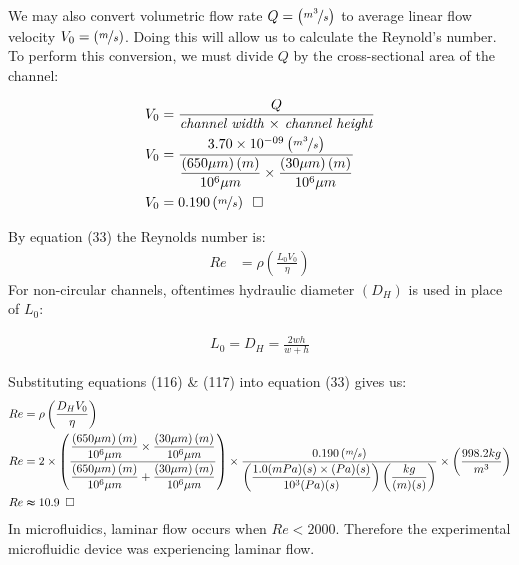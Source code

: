 \documentclass[titlepage]{article}
\begin{document}
\newpage 
\noindent We may also convert volumetric flow rate $Q=\left(\displaystyle\nicefrac{m^3}{s}\right)$ to average linear flow velocity $V_{0}=\left(\displaystyle\nicefrac{m}{s}\right)$. Doing this will allow us to calculate the Reynold's number. To perform this conversion, we must divide $Q$ by the cross-sectional area of the channel: 

\begin{align}
    V_{0} &= \displaystyle\frac{Q}{\text{\emph{channel width $\times$ channel height}}}  \\
    V_{0} &= \displaystyle\frac{3.70\times{10^{-09}}\left(\displaystyle\nicefrac{m^3}{s}\right)}{\displaystyle\frac{\left(650\mu{m}\right)\left(m\right)}{10^{6}\mu{m}}\times\displaystyle\frac{\left(30\mu{m}\right)\left(m\right)}{10^{6}\mu{m}}} \\
    V_{0} &= 0.190\left(\displaystyle\nicefrac{m}{s}\right)\hspace*{5pt}\square
\end{align}

\noindent By equation (33) the Reynolds number is: 
\begin{align*}
    Re &= \rho\left(\displaystyle\frac{L_{0}V_{0}}{\eta}\right)
\end{align*}
\noindent For non-circular channels, oftentimes hydraulic diameter $\left(D_{H}\right)$ is used in place of $L_{0}$: 

\begin{align}
    L_{0} = D_{H} = \displaystyle\frac{2{w}{h}}{w+h}
\end{align}

\noindent Substituting equations (116) \& (117) into equation (33) gives us:
\begingroup
    \addtolength\jot{5pt}
    \begin{align}
        Re &= \rho\left(\displaystyle\frac{D_{H}V_{0}}{\eta}\right) \\
        Re &= 2\times\left(\displaystyle\frac{\displaystyle\frac{\left(650\mu{m}\right)\left(m\right)}{10^{6}\mu{m}}\times\displaystyle\frac{\left(30\mu{m}\right)\left(m\right)}{10^{6}\mu{m}}}{\displaystyle\frac{\left(650\mu{m}\right)\left(m\right)}{10^{6}\mu{m}}+\displaystyle\frac{\left(30\mu{m}\right)\left(m\right)}{10^{6}\mu{m}}}\right)\times\displaystyle\frac{0.190\left(\displaystyle\nicefrac{m}{s}\right)}{\left(\displaystyle\frac{1.0(mPa)(s)\times(Pa)(s)}{10^{3}(Pa)(s)}\right)\left(\displaystyle\frac{kg}{(m)(s)}\right)}\times\left(\displaystyle\frac{998.2kg}{m^3}\right) \\
        Re &\thickapprox 10.9 \hspace*{5pt}\square
    \end{align}
\endgroup
\noindent In microfluidics, laminar flow occurs when $Re <  2000$. Therefore the experimental microfluidic device was experiencing laminar flow.
\end{document}
